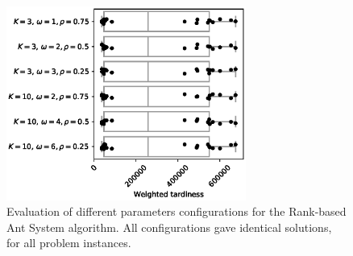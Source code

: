 \documentclass[runningheads]{llncs}
\begin{document}
\begin{figure}
	\centering
	\includegraphics[width=0.7\textwidth]{RankBasedAS-params.eps}
	\caption{Evaluation of different parameters configurations for the
	Rank-based Ant System algorithm. All configurations gave identical
	solutions, for all problem instances.}
	\label{RankBasedAS-params}
\end{figure}
\end{document}

